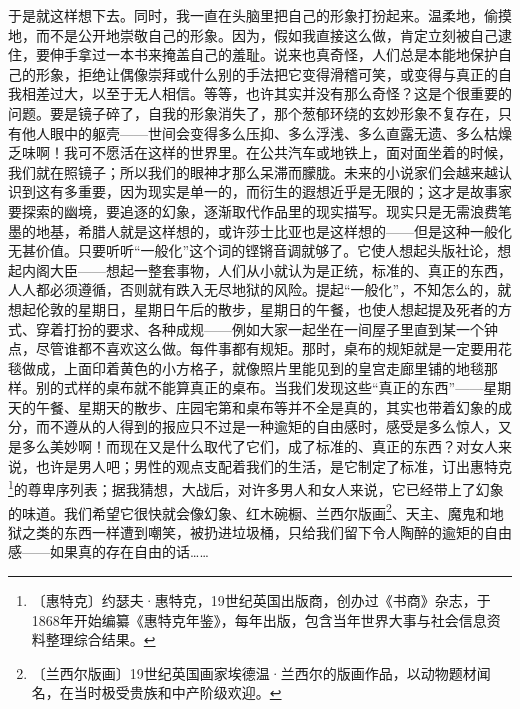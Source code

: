 \documentclass[12pt,UTF-8,openany]{ctexbook}
\begin{document}
\begin{large}
    于是就这样想下去。同时，我一直在头脑里把自己的形象打扮起来。温柔地，偷摸地，而不是公开地崇敬自己的形象。因为，假如我直接这么做，肯定立刻被自己逮住，要伸手拿过一本书来掩盖自己的羞耻。说来也真奇怪，人们总是本能地保护自己的形象，拒绝让偶像崇拜或什么别的手法把它变得滑稽可笑，或变得与真正的自我相差过大，以至于无人相信。等等，也许其实并没有那么奇怪？这是个很重要的问题。要是镜子碎了，自我的形象消失了，那个葱郁环绕的玄妙形象不复存在，只有他人眼中的躯壳——世间会变得多么压抑、多么浮浅、多么直露无遗、多么枯燥乏味啊！我可不愿活在这样的世界里。在公共汽车或地铁上，面对面坐着的时候，我们就在照镜子；所以我们的眼神才那么呆滞而朦胧。未来的小说家们会越来越认识到这有多重要，因为现实是单一的，而衍生的遐想近乎是无限的；这才是故事家要探索的幽境，要追逐的幻象，逐渐取代作品里的现实描写。现实只是无需浪费笔墨的地基，希腊人就是这样想的，或许莎士比亚也是这样想的——但是这种一般化无甚价值。只要听听“一般化”这个词的铿锵音调就够了。它使人想起头版社论，想起内阁大臣——想起一整套事物，人们从小就认为是正统，标准的、真正的东西，人人都必须遵循，否则就有跌入无尽地狱的风险。提起“一般化”，不知怎么的，就想起伦敦的星期日，星期日午后的散步，星期日的午餐，也使人想起提及死者的方式、穿着打扮的要求、各种成规——例如大家一起坐在一间屋子里直到某一个钟点，尽管谁都不喜欢这么做。每件事都有规矩。那时，桌布的规矩就是一定要用花毯做成，上面印着黄色的小方格子，就像照片里能见到的皇宫走廊里铺的地毯那样。别的式样的桌布就不能算真正的桌布。当我们发现这些“真正的东西”——星期天的午餐、星期天的散步、庄园宅第和桌布等并不全是真的，其实也带着幻象的成分，而不遵从的人得到的报应只不过是一种逾矩的自由感时，感受是多么惊人，又是多么美妙啊！而现在又是什么取代了它们，成了标准的、真正的东西？对女人来说，也许是男人吧；男性的观点支配着我们的生活，是它制定了标准，订出惠特克\footnote{〔惠特克〕约瑟夫·惠特克，19世纪英国出版商，创办过《书商》杂志，于1868年开始编纂《惠特克年鉴》，每年出版，包含当年世界大事与社会信息资料整理综合结果。}的尊卑序列表；据我猜想，大战后，对许多男人和女人来说，它已经带上了幻象的味道。我们希望它很快就会像幻象、红木碗橱、兰西尔版画\footnote{〔兰西尔版画〕19世纪英国画家埃德温·兰西尔的版画作品，以动物题材闻名，在当时极受贵族和中产阶级欢迎。}、天主、魔鬼和地狱之类的东西一样遭到嘲笑，被扔进垃圾桶，只给我们留下令人陶醉的逾矩的自由感——如果真的存在自由的话……
    

\end{large}
\end{document}
